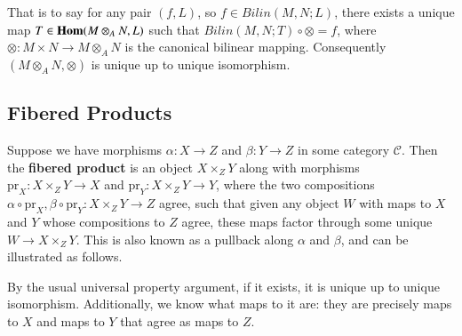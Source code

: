 That is to say for any pair $(f,L)$, so $f \in Bilin(M,N;L)$, there exists a unique map $T \in \mathbf{Hom}(M\otimes_AN,L)$ such that $Bilin(M,N;T)\circ \otimes = f$, where $\otimes:M\times N\rightarrow M\otimes_AN$ is the canonical bilinear mapping. Consequently $(M\otimes_AN,\otimes)$ is unique up to unique isomorphism.


\subsection{Fibered Products}

Suppose we have morphisms $\alpha:X\rightarrow Z$ and $\beta:Y\rightarrow Z$ in some category $\mathscr{C}$. Then the \textbf{fibered product} is an object $X\times_ZY$ along with morphisms $\text{pr}_X:X\times_ZY\rightarrow X$ and $\text{pr}_Y:X\times_ZY\rightarrow Y$, where the two compositions $\alpha\circ \text{pr}_X,\beta \circ \text{pr}_Y:X\times_ZY\rightarrow Z$ agree, such that given any object $W$ with maps to $X$ and $Y$ whose compositions to $Z$ agree, these maps factor through some unique $W\rightarrow X\times_ZY$. This is also known as a pullback along $\alpha$ and $\beta$, and can be illustrated as follows.

\begin{center}
\end{center}

By the usual universal property argument, if it exists, it is unique up to unique isomorphism. Additionally, we know what maps to it are: they are precisely maps to $X$ and maps to $Y$ that agree as maps to $Z$.

